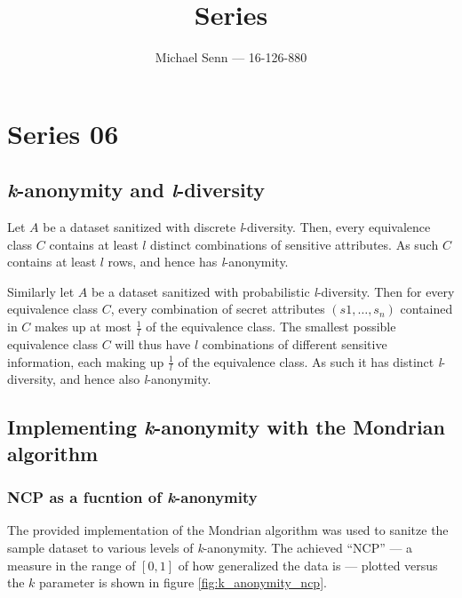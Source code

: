 \documentclass[a4paper]{scrreprt}
\title{Series \series}
\author{Michael Senn \maillink{michael.senn@students.unibe.ch} --- 16-126-880}
\date{\printdate}
\newcommand{\series}{06}
\begin{document}
\maketitle


\setcounter{chapter}{\numexpr \series - 1 \relax}

\chapter{Series \series}

\section{\emph{k}-anonymity and \emph{l}-diversity}

Let $A$ be a dataset sanitized with discrete \emph{l}-diversity. Then, every
equivalence class $C$ contains at least $l$ distinct combinations of sensitive
attributes. As such $C$ contains at least $l$ rows, and hence has
\emph{l}-anonymity.

Similarly let $A$ be a dataset sanitized with probabilistic \emph{l}-diversity.
Then for every equivalence class $C$, every combination of secret attributes
$(s1, \ldots, s_n)$ contained in $C$ makes up at most $\frac{1}{l}$ of the
equivalence class. The smallest possible equivalence class $C$ will thus have
$l$ combinations of different sensitive information, each making up
$\frac{1}{l}$ of the equivalence class. As such it has distinct
\emph{l}-diversity, and hence also \emph{l}-anonymity.

\section{Implementing \emph{k}-anonymity with the Mondrian algorithm}

\subsection{NCP as a fucntion of \emph{k}-anonymity}

The provided implementation of the Mondrian algorithm was used to sanitze the
sample dataset to various levels of \emph{k}-anonymity. The achieved ``NCP''
--- a measure in the range of $[0, 1]$ of how generalized the data is ---
plotted versus the $k$ parameter is shown in figure \ref{fig:k_anonymity_ncp}.
\end{document}
